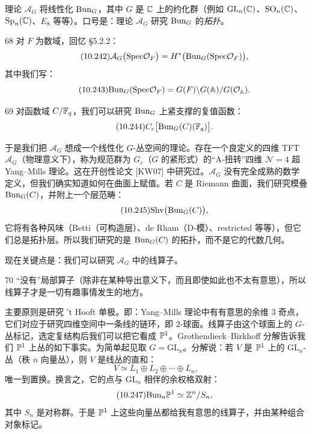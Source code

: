 理论 $\mathcal{A}_G$ 将线性化 $\mathrm{Bun}_G$，其中 $G$ 是 $\mathbb{C}$ 上的约化群（例如 $\mathrm{GL}_n(\mathbb{C})$、$\mathrm{SO}_n(\mathbb{C})$、$\mathrm{Sp}_n(\mathbb{C})$、$E_8$ 等等）。口号是：理论 $\mathcal{A}_G$ 研究 $\mathrm{Bun}_G$ 的\emph{拓扑}。

\begin{srcex}{68}
对 $F$ 为数域，回忆 \S5.2.2：
\begin{equation}\tag{10.242}
\mathcal{A}_G\big(\mathrm{Spec}\mathcal{O}_F\big)=H^{*}\big(\mathrm{Bun}_G(\mathrm{Spec}\mathcal{O}_F)\big),
\end{equation}
其中我们写：
\begin{equation}\tag{10.243}
\mathrm{Bun}_G(\mathrm{Spec}\mathcal{O}_F)=G(F)\backslash G(\mathbb{A})/G(\mathcal{O}_{\mathbb{A}}).
\end{equation}
\end{srcex}

\begin{srcex}{69}
对函数域 $C/\mathbb{F}_q$，我们可以研究 $\mathrm{Bun}_G$ 上紧支撑的复值函数：
\begin{equation}\tag{10.244}
C_c\big[\mathrm{Bun}_G(C)(\mathbb{F}_q)\big].
\end{equation}
\end{srcex}

于是我们把 $\mathcal{A}_G$ 想成一个线性化 $G$-丛空间的理论。存在一个良定义的四维 TFT $\mathcal{A}_G$（物理意义下），称为规范群为 $G_c$（$G$ 的紧形式）的“A-扭转”四维 $\mathcal{N}=4$ 超 Yang--Mills 理论。这在开创性论文 [KW07] 中研究过。$\mathcal{A}_G$ 没有完全成熟的数学定义，但我们确实知道如何在曲面上赋值。若 $C$ 是 Riemann 曲面，我们研究模叠 $\mathrm{Bun}_G(C)$，并附上一个层范畴：
\begin{equation}\tag{10.245}
\mathrm{Shv}\big(\mathrm{Bun}_G(C)\big),
\end{equation}
它将有各种风味（Betti（可构造层）、de Rham（D-模）、restricted 等等），但它们总是拓扑层。所以我们研究的是 $\mathrm{Bun}_G(C)$ 的拓扑，而不是它的代数几何。

现在关键点是：我们可以研究 $\mathcal{A}_G$ 中的线算子。

\begin{srcrem}{70}
“没有”局部算子（除非在某种导出意义下，而且即使如此也不太有意思），所以线算子才是一切有趣事情发生的地方。
\end{srcrem}

主要原则是研究 't Hooft 单极。即：Yang--Mills 理论中有有意思的余维 $3$ 奇点，它们对应于研究四维空间中一条线的链环，即 $2$-球面。线算子由这个球面上的 $G$-丛标记，选定复结构后我们可以把它看成 $\mathbb{P}^1$。Grothendieck--Birkhoff 分解告诉我们 $\mathbb{P}^1$ 上丛的如下事实。为简单起见取 $G=\mathrm{GL}_n$。分解说：若 $V$ 是 $\mathbb{P}^1$ 上的 $\mathrm{GL}_n$-丛（秩 $n$ 向量丛），则 $V$ 是线丛的直和：
\begin{equation}\tag{10.246}
V\simeq L_1\oplus L_2\oplus\cdots\oplus L_n,
\end{equation}
唯一到置换。换言之，它的点与 $\mathrm{GL}_n$ 相伴的余权格双射：
\begin{equation}\tag{10.247}
\mathrm{Bun}_n\mathbb{P}^1\simeq\mathbb{Z}^n/S_n,
\end{equation}
其中 $S_n$ 是对称群。于是 $\mathbb{P}^1$ 上这些向量丛都给我有意思的线算子，并由某种组合对象标记。

